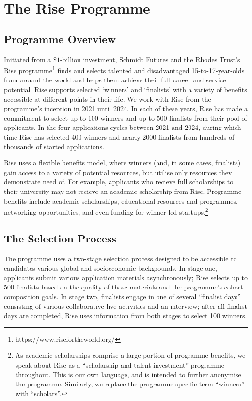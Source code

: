 \section{The Rise Programme}\label{ssec:rise}
\subsection{Programme Overview}
Initiated from a $\$1$-billion investment, Schmidt Futures and the Rhodes Trust's Rise programme\footnote{https://www.risefortheworld.org/} finds and selects talented and disadvantaged 15-to-17-year-olds from around the world and helps them achieve their full career and service potential. Rise supports selected `winners' and `finalists' with a variety of benefits accessible at different points in their life. We work with Rise from the programme's inception in 2021 until 2024. In each of these years, Rise has made a commitment to select up to 100 winners and up to 500 finalists from their pool of applicants. In the four applications cycles between 2021 and 2024, during which time Rise has selected 400 winners and nearly 2000 finalists from hundreds of thousands of started applications.

Rise uses a flexible benefits model, where winners (and, in some cases, finalists) gain access to a variety of potential resources, but utilise only resources they demonstrate need of. For example, applicants who recieve full scholarships to their university may not recieve an academic scholarship from Rise. Programme benefits include academic scholarships, educational resources and programmes, networking opportunities, and even funding for winner-led startups.\footnote{As academic scholarships comprise a large portion of programme benefits, we speak about Rise as a ``scholarship and talent investment'' programme throughout. This is our own language, and is intended to further anonymise the programme. Similarly, we replace the programme-specific term ``winners'' with ``scholars''.}

\subsection{The Selection Process}
The programme uses a two-stage selection process designed to be accessible to candidates various global and socioeconomic backgrounds. In stage one, applicants submit various application materials asynchronously; Rise selects up to 500 finalists based on the quality of those materials and the programme's cohort composition goals. In stage two, finalists engage in one of several ``finalist days'' consisting of various collaborative live activities and an interview; after all finalist days are completed, Rise uses information from both stages to select 100 winners.

